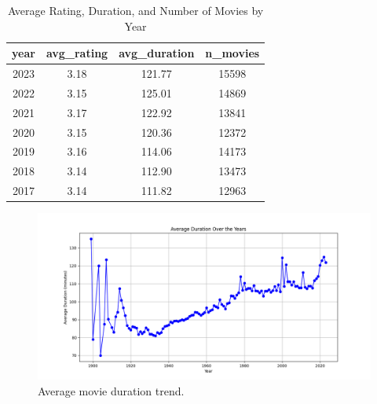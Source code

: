 \documentclass{Configuration_Files/PoliMi3i_thesis}
\begin{document}
\begin{table}[h!]
\centering
\begin{tabular}{|c|c|c|c|}
\hline
\textbf{year} & \textbf{avg\_rating} & \textbf{avg\_duration} & \textbf{n\_movies} \\ \hline
2023 & 3.18 & 121.77 & 15598 \\ \hline
2022 & 3.15 & 125.01 & 14869 \\ \hline
2021 & 3.17 & 122.92 & 13841 \\ \hline
2020 & 3.15 & 120.36 & 12372 \\ \hline
2019 & 3.16 & 114.06 & 14173 \\ \hline
2018 & 3.14 & 112.90 & 13473 \\ \hline
2017 & 3.14 & 111.82 & 12963 \\ \hline
\end{tabular}
\caption{Average Rating, Duration, and Number of Movies by Year}
\end{table}

\begin{figure}[!h]
  \centering
  \includegraphics[width=\textwidth]{latex/letterboxd/visualization/average_duration_trend.png}
  \caption{Average movie duration trend.}
  \label{fig:duration_trend}
\end{figure}
\end{document}

